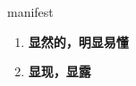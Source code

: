 
\begin{frame}
{\huge manifest}
\begin{center}
\begin{enumerate}\Large
  \item \textbf{显然的，明显易懂}
  \item \textbf{显现，显露}
\end{enumerate}
\end{center}
\end{frame}
